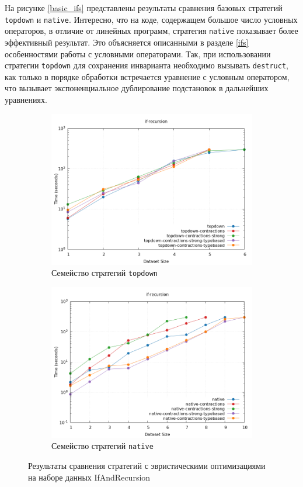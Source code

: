 \documentclass[../thesis.tex]{subfiles}
\begin{document}
На рисунке \ref{basic_ifs} представлены результаты сравнения базовых стратегий \texttt{topdown} и \texttt{native}. Интересно, что на коде, содержащем большое число условных операторов, в отличие от линейных программ, стратегия \texttt{native} показывает более эффективный результат. Это объясняется описанными в разделе \ref{ifs} особенностями работы с условными операторами. Так, при использовании стратегии \texttt{topdown} для сохранения инварианта необходимо вызывать \texttt{destruct}, как только в порядке обработки встречается уравнение с условным оператором, что вызывает экспоненциальное дублирование подстановок в дальнейших уравнениях. 

\begin{figure}[h]
    \begin{subfigure}{0.5\textwidth}
    \includegraphics[width=\linewidth]{topdown_ifrec.png} 
    \caption{Семейство стратегий \texttt{topdown}}
    \label{heuristics_ifs_topdown}
    \end{subfigure}
    \begin{subfigure}{0.5\textwidth}
    \includegraphics[width=\linewidth]{native_ifrec.png}
    \caption{Семейство стратегий \texttt{native}}
    \label{heuristics_ifs_native}
    \end{subfigure}
    \caption{Результаты сравнения стратегий с эвристическими оптимизациями на наборе данных IfAndRecursion}
    \label{heuristics_ifs}
\end{figure}
\end{document}
